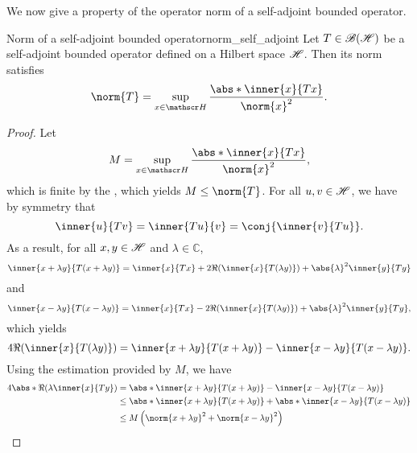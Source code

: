 We now give a property of the operator norm of a self-adjoint bounded operator.
\begin{theorem}{Norm of a self-adjoint bounded operator}{norm_self_adjoint}
    Let \(T \in \mathscr{B}(\mathscr{H})\) be a self-adjoint bounded operator defined on a Hilbert space \(\mathscr{H}\). Then its norm satisfies
    \begin{equation*}
        \norm{T} = \sup_{x \in \hilbert}\frac{\abs*{\inner{x}{Tx}}}{\norm{x}^2}.
    \end{equation*}
\end{theorem}
\begin{proof}
    Let
    \begin{equation*}
        M = \sup_{x \in \hilbert}{\frac{\abs*{\inner{x}{Tx}}}{\norm{x}^2}},
    \end{equation*}
    which is finite by the , which yields \(M \leq \norm{T}\). For all \(u, v \in \mathscr{H}\), we have by symmetry that
    \begin{equation*}
        \inner{u}{Tv} = \inner{Tu}{v} = \conj{\inner{v}{Tu}}.
    \end{equation*}
    As a result, for all \(x, y \in \mathscr{H}\) and \(\lambda \in \mathbb{C}\),
    \begin{equation*}
        \inner{x + \lambda y}{T(x + \lambda y)} = \inner{x}{Tx} + 2\Re{\left(\inner{x}{T(\lambda y)}\right)}+ \abs{\lambda}^2 \inner{y}{Ty}
    \end{equation*}
    and
    \begin{equation*}
        \inner{x - \lambda y}{T(x - \lambda y)} = \inner{x}{Tx} - 2\Re{\left(\inner{x}{T(\lambda y)}\right)} + \abs{\lambda}^2 \inner{y}{Ty},
    \end{equation*}
    which yields
    \begin{equation*}
        4 \Re{\left(\inner{x}{T(\lambda y)}\right)} = \inner{x + \lambda y}{T(x + \lambda y)} - \inner{x - \lambda y}{T(x - \lambda y)}.
    \end{equation*}
    Using the estimation provided by \(M\), we have
    \begin{align*}
        4\abs*{\Re{\left(\lambda \inner{x}{Ty}\right)}} &= \abs*{\inner{x + \lambda y}{T(x + \lambda y)} - \inner{x - \lambda y}{T(x - \lambda y)}}\\
                                                        &\leq \abs*{\inner{x + \lambda y}{T(x + \lambda y)}} + \abs*{\inner{x - \lambda y}{T(x - \lambda y)}}\\
                                                        &\leq M\left(\norm{x + \lambda y}^2 + \norm{x - \lambda y}^2\right)\\

\end{align*}
\end{proof}
